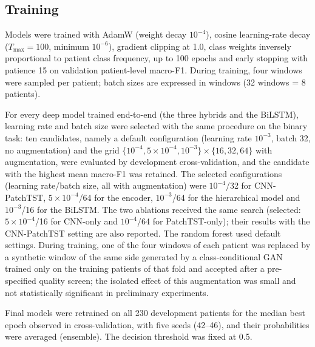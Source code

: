 \documentclass[preprint,12pt]{elsarticle}
\begin{document}
\subsection{Training}
Models were trained with AdamW \cite{loshchilov2019adamw} (weight decay $10^{-4}$), cosine learning-rate decay ($T_{\max}=100$, minimum $10^{-6}$), gradient clipping at 1.0, class weights inversely proportional to patient class frequency, up to 100 epochs and early stopping with patience 15 on validation patient-level macro-F1. During training, four windows were sampled per patient; batch sizes are expressed in windows (32 windows = 8 patients).

For every deep model trained end-to-end (the three hybrids and the BiLSTM), learning rate and batch size were selected with the same procedure on the binary task: ten candidates, namely a default configuration (learning rate $10^{-3}$, batch 32, no augmentation) and the grid $\{10^{-4}, 5\times10^{-4}, 10^{-3}\} \times \{16, 32, 64\}$ with augmentation, were evaluated by development cross-validation, and the candidate with the highest mean macro-F1 was retained. The selected configurations (learning rate/batch size, all with augmentation) were $10^{-4}$/32 for CNN-PatchTST, $5\times10^{-4}$/64 for the encoder, $10^{-3}$/64 for the hierarchical model and $10^{-3}$/16 for the BiLSTM. The two ablations received the same search (selected: $5\times10^{-4}$/16 for CNN-only and $10^{-4}$/64 for PatchTST-only); their results with the CNN-PatchTST setting are also reported. The random forest used default settings. During training, one of the four windows of each patient was replaced by a synthetic window of the same side generated by a class-conditional GAN \cite{goodfellow2014gan} trained only on the training patients of that fold and accepted after a pre-specified quality screen; the isolated effect of this augmentation was small and not statistically significant in preliminary experiments.

Final models were retrained on all 230 development patients for the median best epoch observed in cross-validation, with five seeds (42--46), and their probabilities were averaged (ensemble). The decision threshold was fixed at 0.5.
\end{document}
